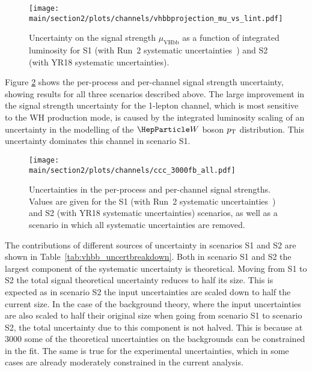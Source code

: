 \begin{figure}[h!]
\begin{center}
\texttt{[image: \\main/section2/plots/channels/vhbbprojection\_mu\_vs\_lint.pdf]}
\end{center}
\caption{Uncertainty on the signal strength $\mu_{\text{VHbb}}$ as a function of integrated luminosity for S1 (with Run~2 systematic uncertainties~\cite{HIG16044}) and S2 (with YR18 systematic uncertainties).}
\label{fig:vhbb_projection_intlumi}
\end{figure}

Figure \ref{fig:vhbb_proj_bars} shows the per-process and
per-channel signal strength uncertainty, showing results for all three scenarios described above.
The large improvement in the signal strength uncertainty for the 1-lepton channel, which is most sensitive to the WH production
mode, is caused by the integrated luminosity scaling of an uncertainty in the modelling of the $\PW$ boson $p\sb{\scriptstyle\mathrm{T}}$ distribution. This uncertainty dominates this channel
in scenario S1.

\begin{figure}[h!]
\begin{center}
\texttt{[image: \\main/section2/plots/channels/ccc\_3000fb\_all.pdf]}
\end{center}
\caption{Uncertainties in the per-process and per-channel signal strengths. Values are given for the S1 (with Run~2 systematic uncertainties~\cite{HIG16044}) and S2 (with YR18 systematic uncertainties) scenarios, as well as a scenario in which all systematic uncertainties are removed.}
\label{fig:vhbb_proj_bars}
\end{figure}

The contributions of different sources of uncertainty in scenarios S1 and S2 are shown in Table~\ref{tab:vhbb_uncertbreakdown}.
Both in scenario S1 and S2 the largest component of the systematic uncertainty is theoretical. Moving from S1 to S2 the total signal theoretical uncertainty reduces to half its size. This is expected as in scenario S2 the input uncertainties
are scaled down to half the current size. In the case of the background theory, where the input uncertainties are also scaled to half their original
size when going from scenario S1 to scenario S2, the total uncertainty due to this component is not halved. This is because at 3000 \fbinv
some of the theoretical uncertainties on the backgrounds can be constrained in the fit. The same is true for the experimental uncertainties, which
in some cases are already moderately constrained in the current analysis.

